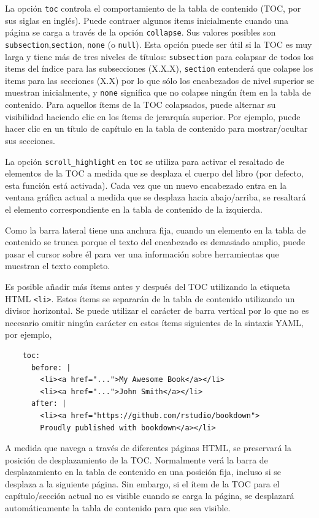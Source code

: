 \documentclass[12pt,]{krantz}
\theoremstyle{definition}
\theoremstyle{definition}
\theoremstyle{remark}
\begin{document}
La opción \texttt{toc} controla el comportamiento de la tabla de
contenido (TOC, por sus siglas en inglés). Puede contraer algunos items
inicialmente cuando una página se carga a través de la opción
\texttt{collapse}. Sus valores posibles son
\texttt{subsection},\texttt{section}, \texttt{none} (o \texttt{null}).
Esta opción puede ser útil si la TOC es muy larga y tiene más de tres
niveles de títulos: \texttt{subsection} para colapsar de todos los items
del índice para las subsecciones (X.X.X), \texttt{section} entenderá que
colapse los items para las secciones (X.X) por lo que sólo los
encabezados de nivel superior se muestran inicialmente, y \texttt{none}
significa que no colapse ningún ítem en la tabla de contenido. Para
aquellos ítems de la TOC colapsados, puede alternar su visibilidad
haciendo clic en los ítems de jerarquía superior. Por ejemplo, puede
hacer clic en un título de capítulo en la tabla de contenido para
mostrar/ocultar sus secciones.

La opción \texttt{scroll\_highlight} en \texttt{toc} se utiliza para
activar el resaltado de elementos de la TOC a medida que se desplaza el
cuerpo del libro (por defecto, esta función está activada). Cada vez que
un nuevo encabezado entra en la ventana gráfica actual a medida que se
desplaza hacia abajo/arriba, se resaltará el elemento correspondiente en
la tabla de contenido de la izquierda.

Como la barra lateral tiene una anchura fija, cuando un elemento en la
tabla de contenido se trunca porque el texto del encabezado es demasiado
amplio, puede pasar el cursor sobre él para ver una información sobre
herramientas que muestran el texto completo.

Es posible añadir más ítems antes y después del TOC utilizando la
etiqueta HTML \texttt{\textless{}li\textgreater{}}. Estos ítems se
separarán de la tabla de contenido utilizando un divisor horizontal. Se
puede utilizar el carácter de barra vertical \texttt{\textbar{}} por lo
que no es necesario omitir ningún carácter en estos ítems siguientes de
la sintaxis YAML, por ejemplo,

\begin{verbatim}
    toc:
      before: |
        <li><a href="...">My Awesome Book</a></li>
        <li><a href="...">John Smith</a></li>
      after: |
        <li><a href="https://github.com/rstudio/bookdown">
        Proudly published with bookdown</a></li>
\end{verbatim}

A medida que navega a través de diferentes páginas HTML, se preservará
la posición de desplazamiento de la TOC. Normalmente verá la barra de
desplazamiento en la tabla de contenido en una posición fija, incluso si
se desplaza a la siguiente página. Sin embargo, si el ítem de la TOC
para el capítulo/sección actual no es visible cuando se carga la página,
se desplazará automáticamente la tabla de contenido para que sea
visible.
\end{document}
